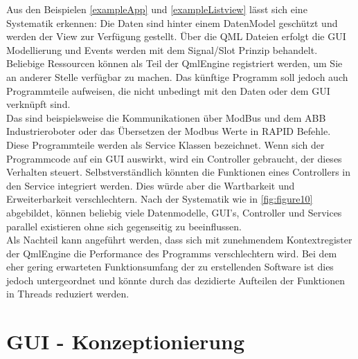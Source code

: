 Aus den Beispielen \ref{exampleApp} und \ref{exampleListview} lässt sich eine Systematik erkennen:
Die Daten sind hinter einem DatenModel geschützt und werden der View zur Verfügung gestellt.
Über die QML Dateien erfolgt die GUI Modellierung und Events werden mit dem Signal/Slot Prinzip behandelt.
Beliebige Ressourcen können als Teil der QmlEngine registriert werden, um Sie an anderer Stelle verfügbar zu machen.
Das künftige Programm soll jedoch auch Programmteile aufweisen, die nicht unbedingt mit den Daten oder dem GUI verknüpft sind.\\
Das sind beispielsweise die Kommunikationen über ModBus und dem ABB Industrieroboter oder das Übersetzen der Modbus Werte in
RAPID Befehle.
Diese Programmteile werden als Service Klassen bezeichnet.
Wenn sich der Programmcode auf ein GUI auswirkt, wird ein Controller gebraucht, der dieses Verhalten steuert.
Selbstverständlich könnten die Funktionen eines Controllers in den Service integriert werden.
Dies würde aber die Wartbarkeit und Erweiterbarkeit verschlechtern.
Nach der Systematik wie in \ref{fig:figure10} abgebildet, können beliebig viele Datenmodelle, GUI's, Controller und Services
parallel existieren ohne sich gegenseitig zu beeinflussen.\\
Als Nachteil kann angeführt werden, dass sich mit zunehmendem Kontextregister der QmlEngine die Performance des Programms
verschlechtern wird.
Bei dem eher gering erwarteten Funktionsumfang der zu erstellenden Software ist dies jedoch untergeordnet und könnte
durch das dezidierte Aufteilen der Funktionen in Threads reduziert werden.

\section{GUI - Konzeptionierung}

